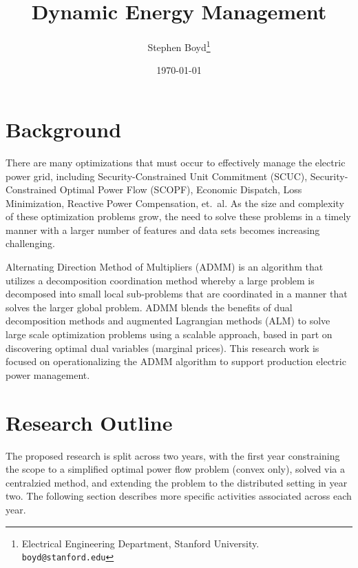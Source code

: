 \documentclass[12pt]{article}
\title{Dynamic Energy Management}
\author{
Stephen Boyd\thanks{
Electrical Engineering Department, Stanford University. 
\texttt{boyd@stanford.edu}}
}
\date{\today}
\begin{document}
\maketitle

\section{Background}

There are many optimizations that must occur
to effectively manage the electric power grid,
including Security-Constrained Unit Commitment (SCUC),
Security-Constrained Optimal Power Flow (SCOPF),
Economic Dispatch, Loss Minimization, Reactive Power Compensation, et.~al.
As the size and complexity of these optimization problems grow,
the need to solve these problems in a timely manner
with a larger number of features and data sets
becomes increasing challenging.

Alternating Direction Method of Multipliers (ADMM)
is an algorithm that utilizes a decomposition coordination method
whereby a large problem is decomposed into small local sub-problems
that are coordinated in a manner that solves the larger global problem.
ADMM blends the benefits of dual decomposition methods
and augmented Lagrangian methods (ALM)
to solve large scale optimization problems using a scalable approach,
based in part on discovering optimal dual variables (marginal prices).
This research work is focused on operationalizing the ADMM algorithm
to support production electric power management.

\section{Research Outline}
The proposed research is split across two years,
with the first year constraining the scope to a simplified
optimal power flow problem (convex only), solved via a centralzied method,
and extending the problem to the distributed setting in year two.
The following section describes more specific activities 
associated across each year.
\end{document}

